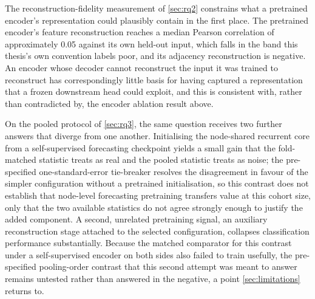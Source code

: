 The reconstruction-fidelity measurement of \autoref{sec:rq2} constrains what a pretrained
encoder's representation could plausibly contain in the first place. The pretrained
encoder's feature reconstruction reaches a median Pearson correlation of approximately
0.05 against its own held-out input, which falls in the band this thesis's own convention
labels poor, and its adjacency reconstruction is negative. An encoder whose decoder cannot
reconstruct the input it was trained to reconstruct has correspondingly little basis for
having captured a representation that a frozen downstream head could exploit, and this is
consistent with, rather than contradicted by, the encoder ablation result above.

On the pooled protocol of \autoref{sec:rq3}, the same question receives two further
answers that diverge from one another. Initialising the node-shared recurrent core from a
self-supervised forecasting checkpoint yields a small gain that the fold-matched statistic
treats as real and the pooled statistic treats as noise; the pre-specified one-standard-error
tie-breaker resolves the disagreement in favour of the simpler configuration without a
pretrained initialisation, so this contrast does not establish that node-level forecasting
pretraining transfers value at this cohort size, only that the two available statistics do
not agree strongly enough to justify the added component. A second, unrelated pretraining
signal, an auxiliary reconstruction stage attached to the selected configuration, collapses
classification performance substantially. Because the matched comparator for this
contrast under a self-supervised encoder on both sides also failed to train usefully, the
pre-specified pooling-order contrast that this second attempt was meant to answer remains
untested rather than answered in the negative, a point \autoref{sec:limitations} returns to.

